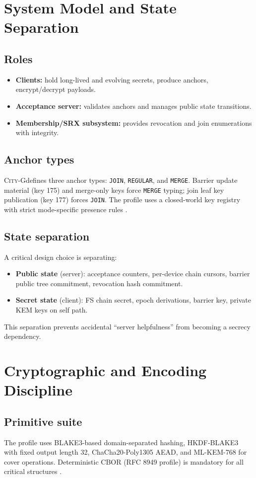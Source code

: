 \documentclass[11pt]{article}
\newcommand{\cityg}{\textsc{City-G}}
\begin{document}
\section{System Model and State Separation}
\subsection{Roles}
\begin{itemize}
  \item \textbf{Clients:} hold long-lived and evolving secrets, produce anchors, encrypt/decrypt payloads.
  \item \textbf{Acceptance server:} validates anchors and manages public state transitions.
  \item \textbf{Membership/SRX subsystem:} provides revocation and join enumerations with integrity.
\end{itemize}

\subsection{Anchor types}
\cityg defines three anchor types: \texttt{JOIN}, \texttt{REGULAR}, and \texttt{MERGE}. Barrier update material (key 175) and merge-only keys force \texttt{MERGE} typing; join leaf key publication (key 177) forces \texttt{JOIN}. The profile uses a closed-world key registry with strict mode-specific presence rules \citep{citygSpec2026}.

\subsection{State separation}
A critical design choice is separating:
\begin{itemize}
  \item \textbf{Public state} (server): acceptance counters, per-device chain cursors, barrier public tree commitment, revocation hash commitment.
  \item \textbf{Secret state} (client): FS chain secret, epoch derivations, barrier key, private KEM keys on self path.
\end{itemize}
This separation prevents accidental ``server helpfulness'' from becoming a secrecy dependency.

\section{Cryptographic and Encoding Discipline}
\subsection{Primitive suite}
The profile uses BLAKE3-based domain-separated hashing, HKDF-BLAKE3 with fixed output length 32, ChaCha20-Poly1305 AEAD, and ML-KEM-768 for cover operations. Deterministic CBOR (RFC 8949 profile) is mandatory for all critical structures \citep{blake3,rfc8949,rfc8439,fips203}.
\end{document}
